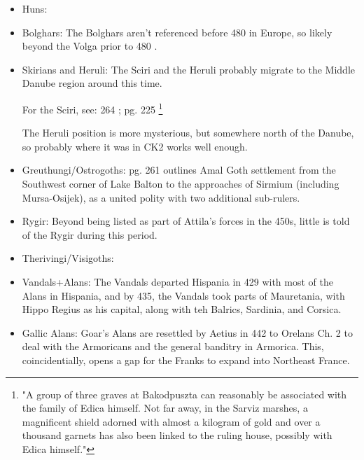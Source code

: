 \documentclass{article}
\newcommand{\specificCite}[1]{\tiny #1 \normalsize}
\begin{document}
	\begin{itemize}
		\item Huns:\newline
		
		\item Bolghars:\newline
		The Bolghars aren't referenced before 480 in Europe, so likely beyond the Volga prior to 480 \cite{KimHuns}.
		
		\item Skirians and Heruli:\newline
		The Sciri and the Heruli probably migrate to the Middle Danube region around this time.
		
		For the Sciri, see: \cite{WolframHistoryOfTheGoths,ToddEarlyGermans} \specificCite{264}; \specificCite{pg. 225}\footnote{"A group of three graves at Bakodpuszta can reasonably be associated with the family of Edica himself. Not far away, in the Sarviz marshes, a magnificent shield adorned with almost a kilogram of gold and over a thousand garnets has also been linked to the ruling house, possibly with Edica himself."}
		
		The Heruli position is more mysterious, but somewhere north of the Danube, so probably where it was in CK2 works well enough.
		
		\item Greuthungi/Ostrogoths:\newline
		\cite{WolframHistoryOfTheGoths}\specificCite{pg. 261} outlines Amal Goth settlement from the Southwest corner of Lake Balton to the approaches of Sirmium (including Mursa-Osijek), as a united polity with two additional sub-rulers.
		
		\item Rygir:\newline
		Beyond being listed as part of Attila's forces in the 450s, little is told of the Rygir during this period.
		
		\item Therivingi/Visigoths:\newline
		
		\item Vandals+Alans:\newline
		The Vandals departed Hispania in 429 with most of the Alans in Hispania, and by 435, the Vandals took parts of Mauretania, with Hippo Regius as his capital, along with teh Balrics, Sardinia, and Corsica. 
		
		\item Gallic Alans:\newline
		Goar's Alans are resettled by Aetius in 442 to Orelans \cite{BachrachAlans}\specificCite{Ch. 2} to deal with the Armoricans and the general banditry in Armorica.
		This, coincidentially, opens a gap for the Franks to expand into Northeast France.
		

\end{itemize}
\end{document}
